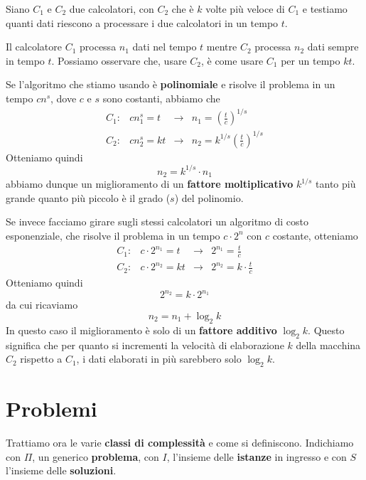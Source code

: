 \begin{example}
	Siano $C_1$ e $C_2$ due calcolatori, con $C_2$ che \`e $k$ volte pi\`u veloce di $C_1$ e testiamo quanti dati
	riescono a processare i due calcolatori in un tempo $t$.

	Il calcolatore $C_1$ processa $n_1$ dati nel tempo $t$ mentre $C_2$ processa $n_2$ dati sempre in tempo $t$.
	Possiamo osservare che, usare $C_2$, \`e come usare $C_1$ per un tempo $kt$.

	Se l'algoritmo che stiamo usando \`e \textbf{polinomiale} e risolve il problema in un tempo $cn^s$, dove
	$c$ e $s$ sono costanti, abbiamo che
	\[	\begin{array}{llcl}
			C_1 : & c n_1^s = t  & \rightarrow &
			n_1 = \left( \displaystyle\frac{t}{c} \right)^{1/s} \\

			C_2 : & c n_2^s = kt & \rightarrow &
			n_2 = k^{1/s}\left( \displaystyle\frac{t}{c} \right)^{1/s}
		\end{array}
	\]
	Otteniamo quindi
	\[ n_2 = k^{1/s} \cdot n_1 \]
	abbiamo dunque un miglioramento di un \textbf{fattore moltiplicativo} $k^{1/s}$ tanto pi\`u grande quanto pi\`u
	piccolo \`e il grado ($s$) del polinomio.

	Se invece facciamo girare sugli stessi calcolatori un algoritmo di costo esponenziale, che risolve il problema in
	un tempo $c \cdot 2^n$ con $c$ costante, otteniamo
	\[
		\begin{array}{llcl}
			C_1 : & c \cdot 2^{n_1} = t   & \rightarrow & 2^{n_1} = \displaystyle\frac{t}{c}         \\
			C_2 : & c \cdot 2^{n_2} = k t & \rightarrow & 2^{n_2} = k \cdot \displaystyle\frac{t}{c}
		\end{array}
	\]
	Otteniamo quindi
	\[ 2^{n_2} = k \cdot 2^{n_1} \]
	da cui ricaviamo
	\[ n_2 = n_1 + \log_2 k \]
	In questo caso il miglioramento \`e solo di un \textbf{fattore additivo} $\log_2 k$. Questo significa che per
	quanto si incrementi la velocit\`a di elaborazione $k$ della macchina $C_2$ rispetto a $C_1$, i dati elaborati in
	pi\`u sarebbero solo $\log_2 k$.
\end{example}

\section{Problemi}\label{problemi}
Trattiamo ora le varie \textbf{classi di complessit\`a} e come si definiscono. Indichiamo con $\Pi$, un generico
\textbf{problema}, con $I$, l'insieme delle \textbf{istanze} in ingresso e con $S$ l'insieme delle \textbf{soluzioni}.

